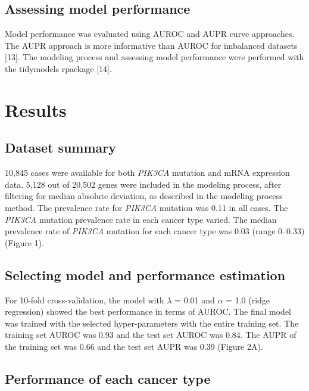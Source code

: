 \documentclass[10pt,letterpaper]{article}
\begin{document}
\hypertarget{assessing-model-performance}{%
\subsection{Assessing model
performance}\label{assessing-model-performance}}

Model performance was evaluated using AUROC and AUPR curve approaches.
The AUPR approach is more informative than AUROC for imbalanced datasets
{[}13{]}. The modeling process and assessing model performance were
performed with the tidymodels rpackage {[}14{]}.

\hypertarget{results}{%
\section{Results}\label{results}}

\hypertarget{dataset-summary}{%
\subsection{Dataset summary}\label{dataset-summary}}

10,845 cases were available for both \emph{PIK3CA} mutation and mRNA
expression data. 5,128 out of 20,502 genes were included in the modeling
process, after filtering for median absolute deviation, as described in
the modeling process method. The prevalence rate for \emph{PIK3CA}
mutation was 0.11 in all cases. The \emph{PIK3CA} mutation prevalence
rate in each cancer type varied. The median prevalence rate of
\emph{PIK3CA} mutation for each cancer type was 0.03 (range 0--0.33)
(Figure 1).

\hypertarget{selecting-model-and-performance-estimation}{%
\subsection{Selecting model and performance
estimation}\label{selecting-model-and-performance-estimation}}

For 10-fold cross-validation, the model with \(\lambda\) = 0.01 and
\(\alpha\) = 1.0 (ridge regression) showed the best performance in terms
of AUROC. The final model was trained with the selected hyper-parameters
with the entire training set. The training set AUROC was 0.93 and the
test set AUROC was 0.84. The AUPR of the training set was 0.66 and the
test set AUPR was 0.39 (Figure 2A).

\hypertarget{performance-of-each-cancer-type}{%
\subsection{Performance of each cancer
type}\label{performance-of-each-cancer-type}}
\end{document}
